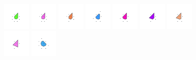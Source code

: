 \documentclass[text.tex]{subfiles}
\begin{document}
\begin{figure}[h!]
\includegraphics[width=0.12\textwidth]{img/results/circle8/circle8_216067_(3109_-1286alpha_2)_005.pdf}
\includegraphics[width=0.12\textwidth]{img/results/circle8/circle8_216067_(3109_-1286alpha_2)_006.pdf}
\includegraphics[width=0.12\textwidth]{img/results/circle8/circle8_216067_(3109_-1286alpha_2)_007.pdf}
\includegraphics[width=0.12\textwidth]{img/results/circle8/circle8_216067_(3109_-1286alpha_2)_008.pdf}
\includegraphics[width=0.12\textwidth]{img/results/circle8/circle8_216067_(3109_-1286alpha_2)_009.pdf}
\includegraphics[width=0.12\textwidth]{img/results/circle8/circle8_216067_(3109_-1286alpha_2)_010.pdf}
\includegraphics[width=0.12\textwidth]{img/results/circle8/circle8_216067_(3109_-1286alpha_2)_011.pdf}
\includegraphics[width=0.12\textwidth]{img/results/circle8/circle8_216067_(3109_-1286alpha_2)_012.pdf}
\includegraphics[width=0.12\textwidth]{img/results/circle8/circle8_216067_(3109_-1286alpha_2)_013.pdf}

\end{figure}
\end{document}
